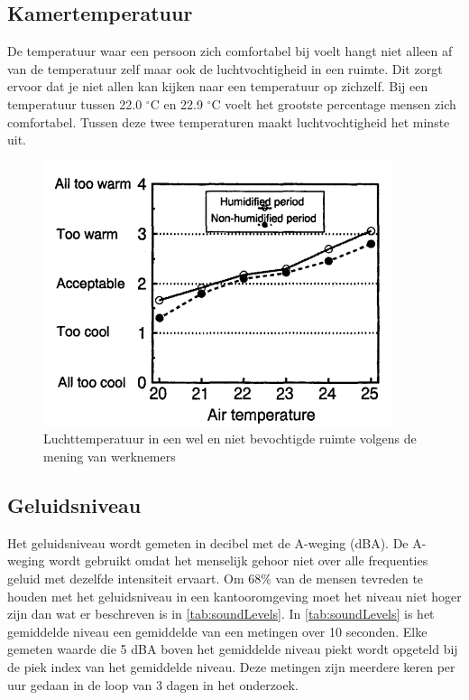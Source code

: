\subsection{Kamertemperatuur}
De temperatuur waar een persoon zich comfortabel bij voelt hangt niet alleen af van de temperatuur zelf maar ook de luchtvochtigheid in een ruimte\cite{palonen1993effects}. Dit zorgt ervoor dat je niet allen kan kijken naar een temperatuur op zichzelf. Bij een temperatuur tussen 22.0 $^{\circ}$C en 22.9 $^{\circ}$C voelt het grootste percentage mensen zich comfortabel. Tussen deze twee temperaturen maakt luchtvochtigheid het minste uit. 
\begin{figure}[ht]
    \centering
    \includegraphics[scale=0.8]{img/tempHumidGraph.png}
    \caption{Luchttemperatuur in een wel en niet bevochtigde ruimte volgens de mening van werknemers\cite{palonen1993effects}}
\end{figure}


\subsection{Geluidsniveau}
Het geluidsniveau wordt gemeten in decibel met de A-weging (dBA)\cite{aWeighting}. De A-weging wordt gebruikt omdat het menselijk gehoor niet over alle frequenties geluid met dezelfde intensiteit ervaart. Om 68\% van de mensen tevreden te houden met het geluidsniveau in een kantooromgeving moet het niveau niet hoger zijn dan wat er beschreven is in \autoref{tab:soundLevels}\cite{geluid-levels}. In \autoref{tab:soundLevels} is het gemiddelde niveau een gemiddelde van een metingen over 10 seconden. Elke gemeten waarde die 5 dBA boven het gemiddelde niveau piekt wordt opgeteld bij de piek index van het gemiddelde niveau. Deze metingen zijn meerdere keren per uur gedaan in de loop van 3 dagen in het onderzoek\cite{geluid-levels}. 


